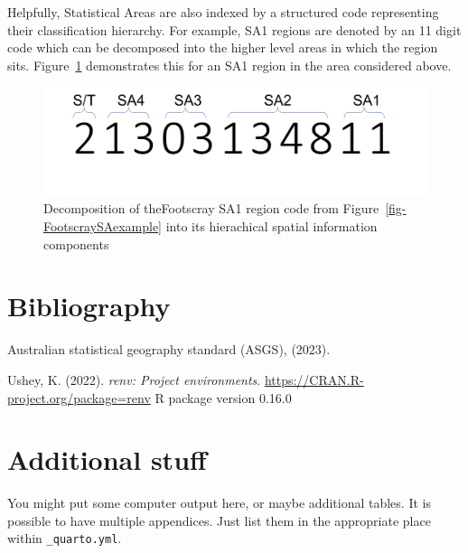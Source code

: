 \documentclass{monashthesis}
\begin{document}
Helpfully, Statistical Areas are also indexed by a structured code
representing their classification hierarchy. For example, SA1 regions
are denoted by an 11 digit code which can be decomposed into the higher
level areas in which the region sits. Figure~\ref{fig-FootscraySA1Code}
demonstrates this for an SA1 region in the area considered above.

\begin{figure}

{\centering \includegraphics{FootscraySA1eg.png}

}

\caption{\label{fig-FootscraySA1Code}Decomposition of theFootscray SA1
region code from Figure~\ref{fig-FootscraySAexample} into its
hierachical spatial information components}

\end{figure}


\hypertarget{bibliography}{%
\chapter*{Bibliography}\label{bibliography}}


\hypertarget{refs}{}
\begin{CSLReferences}{1}{0}
\leavevmode{}%
Australian statistical geography standard (ASGS), (2023).

\leavevmode{}%
Ushey, K. (2022). \emph{{renv}: Project environments}.
\url{https://CRAN.R-project.org/package=renv} R package version 0.16.0

\end{CSLReferences}

\cleardoublepage
{}
{}
\appendix

\hypertarget{additional-stuff}{%
\chapter{Additional stuff}\label{additional-stuff}}

You might put some computer output here, or maybe additional tables. It
is possible to have multiple appendices. Just list them in the
appropriate place within \texttt{\_quarto.yml}.
\end{document}
